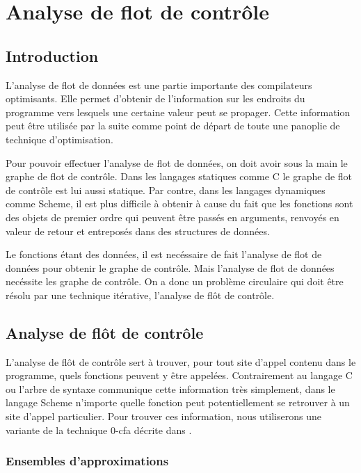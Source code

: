 \chapter{Analyse de flot de contrôle}

\section{Introduction}

L'analyse de flot de données est une partie importante des
compilateurs optimisants. Elle permet d'obtenir de l'information sur
les endroits du programme vers lesquels une certaine valeur peut se
propager. Cette information peut être utilisée par la suite comme
point de départ de toute une panoplie de technique d'optimisation.

Pour pouvoir effectuer l'analyse de flot de données, on doit avoir
sous la main le graphe de flot de contrôle. Dans les langages
statiques comme C le graphe de flot de contrôle est lui aussi
statique. Par contre, dans les langages dynamiques comme Scheme, il
est plus difficile à obtenir à cause du fait que les fonctions sont
des objets de premier ordre qui peuvent être passés en arguments,
renvoyés en valeur de retour et entreposés dans des structures de
données.

Le fonctions étant des données, il est necéssaire de fait l'analyse de
flot de données pour obtenir le graphe de contrôle. Mais l'analyse de
flot de données necéssite les graphe de contrôle. On a donc un
problème circulaire qui doit être résolu par une technique itérative,
l'analyse de flôt de contrôle.

\clearpage

\section{Analyse de flôt de contrôle}

L'analyse de flôt de contrôle sert à trouver, pour tout site d'appel
contenu dans le programme, quels fonctions peuvent y être
appelées. Contrairement au langage C ou l'arbre de syntaxe communique
cette information très simplement, dans le langage Scheme n'importe
quelle fonction peut potentiellement se retrouver à un site d'appel
particulier. Pour trouver ces information, nous utiliserons une
variante de la technique 0-cfa décrite dans \cite{shivers88, shivers91}.

\subsection{Ensembles d'approximations}

